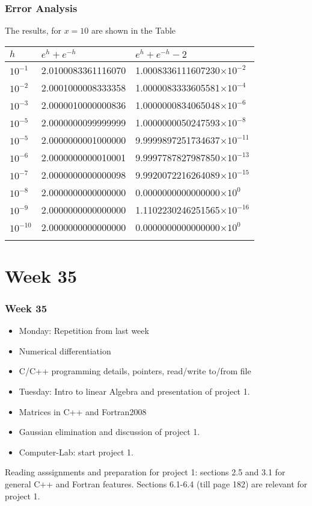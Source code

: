 \documentclass[compress]{beamer}
\begin{document}
\frame
{
  \frametitle{Error Analysis}
  \begin{block}{}
\begin{small}
{\scriptsize
The results, for $x=10$ are shown in the Table
\begin{tabular}{lll}\hline
$h$&$e^{h}+e^{-h}$ & $e^{h}+e^{-h}-2$\\\hline
 $10^{-1}$ & 2.0100083361116070 &  1.0008336111607230$\times 10^{-2}$ \\
 $10^{-2}$ & 2.0001000008333358 &  1.0000083333605581$\times 10^{-4}$ \\
 $10^{-3}$ & 2.0000010000000836 &  1.0000000834065048$\times 10^{-6}$ \\
 $10^{-5}$ & 2.0000000099999999 &  1.0000000050247593$\times 10^{-8}$ \\
 $10^{-5}$ & 2.0000000001000000 &  9.9999897251734637$\times 10^{-11}$  \\
 $10^{-6}$ & 2.0000000000010001 &  9.9997787827987850$\times 10^{-13}$  \\
 $10^{-7}$ & 2.0000000000000098 &  9.9920072216264089$\times 10^{-15}$  \\
 $10^{-8}$ & 2.0000000000000000 &  0.0000000000000000$\times 10^{0}$ \\
 $10^{-9}$ & 2.0000000000000000 &  1.1102230246251565$\times 10^{-16}$  \\
 $10^{-10}$  & 2.0000000000000000 &  0.0000000000000000$\times 10^{0}$ \\
&&\\\hline
\end{tabular}
}
\end{small}
  \end{block}
}



\section[Week 35]{Week 35}
\frame
{
  \frametitle{Week 35}
  \begin{block}{}
\begin{itemize}
\item Monday: Repetition from last week
\item Numerical differentiation
\item C/C++ programming details, pointers, read/write to/from file
\item Tuesday: Intro to linear Algebra  and
presentation of project 1.
\item Matrices in C++ and Fortran2008
\item Gaussian elimination and discussion of project 1.
\item Computer-Lab: start project 1.
\end{itemize}
Reading asssignments and preparation for project 1: sections 2.5 and 3.1 for general C++ and Fortran features.
Sections 6.1-6.4 (till page 182) are relevant for project 1.
  \end{block}
}
\end{document}
